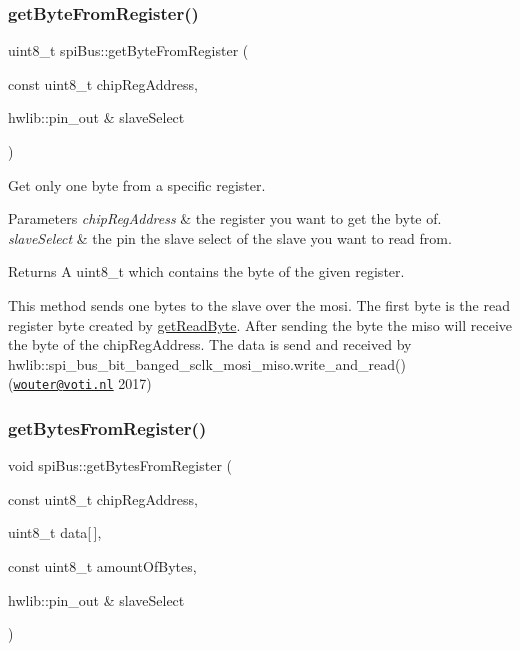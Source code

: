 \subsubsection{\texorpdfstring{get\+Byte\+From\+Register()}{getByteFromRegister()}}
{\footnotesize\ttfamily uint8\+\_\+t spi\+Bus\+::get\+Byte\+From\+Register (\begin{DoxyParamCaption}\item[{const uint8\+\_\+t}]{chip\+Reg\+Address,  }\item[{hwlib\+::pin\+\_\+out \&}]{slave\+Select }\end{DoxyParamCaption})}



Get only one byte from a specific register. 


\begin{DoxyParams}{Parameters}
{\em chip\+Reg\+Address} & the register you want to get the byte of. \\
\hline
{\em slave\+Select} & the pin the slave select of the slave you want to read from. \\
\hline
\end{DoxyParams}
\begin{DoxyReturn}{Returns}
A uint8\+\_\+t which contains the byte of the given register.
\end{DoxyReturn}
This method sends one bytes to the slave over the mosi. The first byte is the read register byte created by \mbox{\hyperlink{classspi_bus_a6e5f0193b056b4b58db49e1c6ce5d807}{get\+Read\+Byte}}. After sending the byte the miso will receive the byte of the chip\+Reg\+Address. The data is send and received by hwlib\+::spi\+\_\+bus\+\_\+bit\+\_\+banged\+\_\+sclk\+\_\+mosi\+\_\+miso.\+write\+\_\+and\+\_\+read() (\href{mailto:wouter@voti.nl}{\tt wouter@voti.\+nl} 2017) \mbox{\label{classspi_bus_a58318fdc7b4ff1869be4f0f321a853a8}} 
\subsubsection{\texorpdfstring{get\+Bytes\+From\+Register()}{getBytesFromRegister()}}
{\footnotesize\ttfamily void spi\+Bus\+::get\+Bytes\+From\+Register (\begin{DoxyParamCaption}\item[{const uint8\+\_\+t}]{chip\+Reg\+Address,  }\item[{uint8\+\_\+t}]{data\mbox{[}$\,$\mbox{]},  }\item[{const uint8\+\_\+t}]{amount\+Of\+Bytes,  }\item[{hwlib\+::pin\+\_\+out \&}]{slave\+Select }\end{DoxyParamCaption})}



